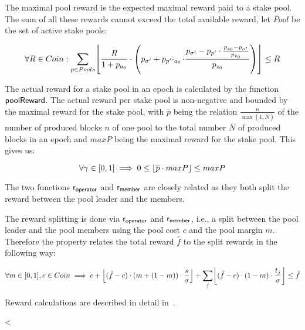 \begin{property}
  \label{prop:maximal-pool-reward}

  The maximal pool reward is the expected maximal reward paid to a stake
  pool. The sum of all these rewards cannot exceed the total available reward,
  let $Pool$ be the set of active stake pools:

  \begin{equation*}
    \forall R \in Coin:\sum_{p \in Pools} \floor*{\frac{R}{1+p_{a_{0}}}\cdot
      \left(
        p_{\sigma'}+p_{p'}\cdotp_{a_{0}}\cdot\frac{p_{\sigma'}-p_{p'}\cdot\frac{p_{z_{0}}-p_{\sigma'}}{p_{z_{0}}}}{p_{z_{0}}}
      \right)}\leq R
  \end{equation*}
\end{property}

\begin{property}
  \label{prop:actual-reward}

  The actual reward for a stake pool in an epoch is calculated by the function
  $\fun{poolReward}$. The actual reward per stake pool is non-negative and
  bounded by the maximal reward for the stake pool, with $\overline{p}$ being
  the relation $\frac{n}{\max(1, \overline{N})}$ of the number of produced
  blocks $n$ of one pool to the total number $\overline{N}$ of produced blocks
  in an epoch and $maxP$ being the maximal reward for the stake pool. This gives
  us:

  \begin{equation*}
    \forall \gamma \in [0,1] \implies 0\leq \floor*{\overline{p}\cdot maxP} \leq maxP
  \end{equation*}
\end{property}

The two functions $\fun{r_{operator}}$ and $\fun{r_{member}}$ are closely related as
they both split the reward between the pool leader and the members.

\begin{property}
  \label{prop:reward-splitting}

  The reward splitting is done via $\fun{r_{operator}}$ and $\fun{r_{member}}$, i.e.,
  a split between the pool leader and the pool members using the pool cost $c$
  and the pool margin $m$. Therefore the property relates the total reward
  $\hat{f}$ to the split rewards in the following way:

  \begin{multline*}
    \forall m\in [0,1], c\in Coin \implies c + \floor*{(\hat{f} - c)\cdot (m +
      (1 - m)) \cdot \frac{s}{\sigma}} + \sum_{j}\floor*{(\hat{f} -
      c)\cdot(1-m)\cdot\frac{t_{j}}{\sigma}} \leq \hat{f}
  \end{multline*}

\end{property}

\noindent
Reward calculations are described in detail in~\cite{deleg_design,ledger_rewards}.

\clearpage

<
